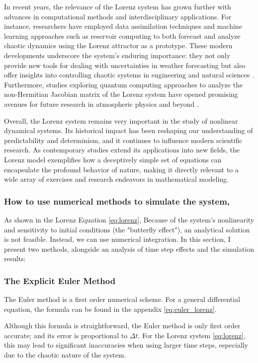 In recent years, the relevance of the Lorenz system has grown further with advances in computational methods and interdisciplinary applications. For instance, researchers have employed data assimilation techniques and machine learning approaches such as reservoir computing to both forecast and analyze chaotic dynamics using the Lorenz attractor as a prototype. These modern developments underscore the system’s enduring importance: they not only provide new tools for dealing with uncertainties in weather forecasting but also offer insights into controlling chaotic systems in engineering and natural sciences \cite{Pathak_2017}. Furthermore, studies exploring quantum computing approaches to analyze the non-Hermitian Jacobian matrix of the Lorenz system have opened promising avenues for future research in atmospheric physics and beyond \cite{armaos2024quantumcomputingatmosphericdynamics}.

Overall, the Lorenz system remains very important in the study of nonlinear dynamical systems. Its historical impact has been reshaping our understanding of predictability and determinism, and it continues to influence modern scientific research. As contemporary studies extend its applications into new fields, the Lorenz model exemplifies how a deceptively simple set of equations can encapsulate the profound behavior of nature, making it directly relevant to a wide array of exercises and research endeavors in mathematical modeling.

\subsubsection{How to use numerical methods to simulate the system, }
As shown in the Lorenz Equation \ref{eq:lorenz}, Because of the system's nonlinearity and sensitivity to initial conditions (the "butterfly effect"), an analytical solution is not feasible. Instead, we can use numerical integration. In this section, I present two methods, alongside an analysis of time step effects and the simulation results:


\subsubsection{The Explicit Euler Method}

The Euler method is a first order numerical scheme. For a general differential equation, the formula can be found in the appendix \ref{eq:euler_lorenz}.

Although this formula is straightforward, the Euler method is only first order accurate; and its error is proportional to $\Delta t$. For the Lorenz system \ref{eq:lorenz}, this may lead to significant inaccuracies when using larger time steps, especially due to the chaotic nature of the system.

